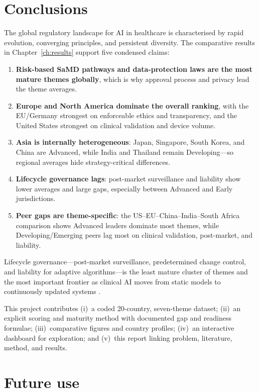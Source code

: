 \documentclass[12pt,a4paper]{report}
\begin{document}
\section{Conclusions}

The global regulatory landscape for AI in healthcare is characterised by rapid evolution, converging principles, and persistent diversity. The comparative results in Chapter~\ref{ch:results} support five condensed claims:

\begin{enumerate}
  \item \textbf{Risk-based SaMD pathways and data-protection laws are the most mature themes globally}, which is why approval process and privacy lead the theme averages.
  \item \textbf{Europe and North America dominate the overall ranking}, with the EU/Germany strongest on enforceable ethics and transparency, and the United States strongest on clinical validation and device volume.
  \item \textbf{Asia is internally heterogeneous}: Japan, Singapore, South Korea, and China are Advanced, while India and Thailand remain Developing---so regional averages hide strategy-critical differences.
  \item \textbf{Lifecycle governance lags}: post-market surveillance and liability show lower averages and large gaps, especially between Advanced and Early jurisdictions.
  \item \textbf{Peer gaps are theme-specific}: the US--EU--China--India--South Africa comparison shows Advanced leaders dominate most themes, while Developing/Emerging peers lag most on clinical validation, post-market, and liability.
\end{enumerate}

Lifecycle governance---post-market surveillance, predetermined change control, and liability for adaptive algorithms---is the least mature cluster of themes and the most important frontier as clinical AI moves from static models to continuously updated systems \cite{babic2019,hwang2019}.

This project contributes (i)~a coded 20-country, seven-theme dataset; (ii)~an explicit scoring and maturity method with documented gap and readiness formulae; (iii)~comparative figures and country profiles; (iv)~an interactive dashboard for exploration; and (v)~this report linking problem, literature, method, and results.

\section{Future use}
\end{document}
